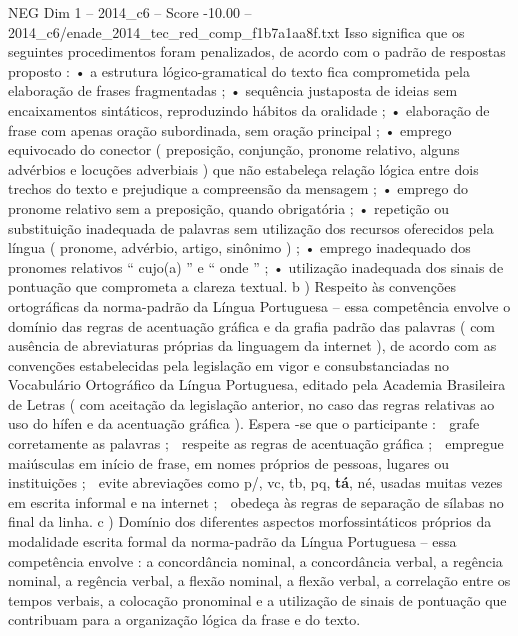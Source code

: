 \begin{textsample}{NEG Dim 1 – 2014\_c6 – Score -10.00 – 2014\_c6/enade\_2014\_tec\_red\_comp\_f1b7a1aa8f.txt}
Isso significa que os seguintes procedimentos foram penalizados, de acordo com o padrão de respostas proposto : • a estrutura lógico-gramatical do texto fica comprometida pela elaboração de frases fragmentadas ; • sequência justaposta de ideias sem encaixamentos sintáticos, reproduzindo hábitos da oralidade ; • elaboração de frase com apenas oração subordinada, sem oração principal ; • emprego equivocado do conector ( preposição, conjunção, pronome relativo, alguns advérbios e locuções adverbiais ) que não estabeleça relação lógica entre dois trechos do texto e prejudique a compreensão da mensagem ; • emprego do pronome relativo sem a preposição, quando obrigatória ; • repetição ou substituição inadequada de palavras sem utilização dos recursos oferecidos pela língua ( pronome, advérbio, artigo, sinônimo ) ; • emprego inadequado dos pronomes relativos “ cujo(a) ” e “ onde ” ; • utilização inadequada dos sinais de pontuação que comprometa a clareza textual. b ) Respeito às convenções ortográficas da norma-padrão da Língua Portuguesa – essa competência envolve o domínio das regras de acentuação gráfica e da grafia padrão das palavras ( com ausência de abreviaturas próprias da linguagem da internet ), de acordo com as convenções estabelecidas pela legislação em vigor e consubstanciadas no Vocabulário Ortográfico da Língua Portuguesa, editado pela Academia Brasileira de Letras ( com aceitação da legislação anterior, no caso das regras relativas ao uso do hífen e da acentuação gráfica ).
Espera -se que o participante :  grafe corretamente as palavras ;  respeite as regras de acentuação gráfica ;  empregue maiúsculas em início de frase, em nomes próprios de pessoas, lugares ou instituições ;  evite abreviações como p/, vc, tb, pq, \textbf{tá}, né, usadas muitas vezes em escrita informal e na internet ;  obedeça às regras de separação de sílabas no final da linha. c ) Domínio dos diferentes aspectos morfossintáticos próprios da modalidade escrita formal da norma-padrão da Língua Portuguesa – essa competência envolve : a concordância nominal, a concordância verbal, a regência nominal, a regência verbal, a flexão nominal, a flexão verbal, a correlação entre os tempos verbais, a colocação pronominal e a utilização de sinais de pontuação que contribuam para a organização lógica da frase e do texto.

\end{textsample}
